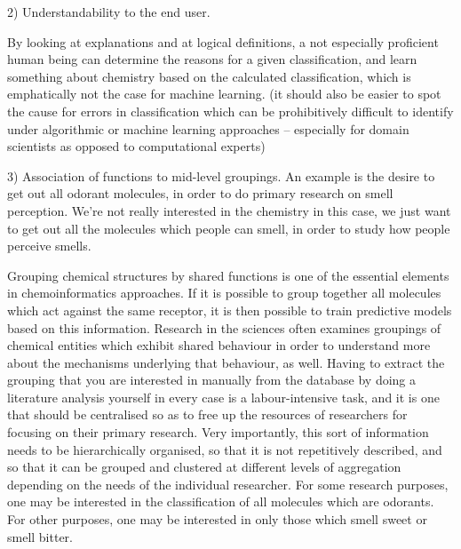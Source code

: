 \documentclass[10pt]{bmc_article}
\newenvironment{bmcformat}{\baselineskip20pt\sloppy\setboolean{publ}{false}}{\baselineskip20pt\sloppy}
\begin{document}
\begin{bmcformat}
2) Understandability to the end user. 

By looking at explanations and at logical definitions, a not especially proficient human being can determine the reasons for a given classification, and learn something about chemistry based on the calculated classification, which is emphatically not the case for machine learning. (it should also be easier to spot the cause for errors in classification which can be prohibitively difficult to identify under algorithmic or machine learning approaches -- especially for domain scientists as opposed to computational experts)


3) Association of functions to mid-level groupings.
An example is the desire to get out all odorant molecules, in order to do primary research on smell perception. 
We're not really interested in the chemistry in this case, we just want to get out all the molecules which people can smell, in order to study how people perceive smells. %

Grouping chemical structures by shared functions is one of the essential elements in chemoinformatics approaches.  If it is possible to group together all molecules which act against the same receptor, it is then possible to train predictive models based on this information.   %
Research in the sciences often examines groupings of chemical entities which exhibit shared behaviour in order to understand more about the mechanisms underlying that behaviour, as well. 
Having to extract the grouping that you are interested in manually from the database by doing a literature analysis yourself in every case is a labour-intensive task, and it is one that should be centralised so as to free up the resources of researchers for focusing on their primary research. 
Very importantly, this sort of information needs to be hierarchically organised, so that it is not repetitively described, and so that it can be grouped and clustered at different levels of aggregation depending on the needs of the individual researcher.  For some research purposes, one may be interested in the classification of all molecules which are odorants. For other purposes, one may be interested in only those which smell sweet or smell bitter. 


\end{bmcformat}
\end{document}
